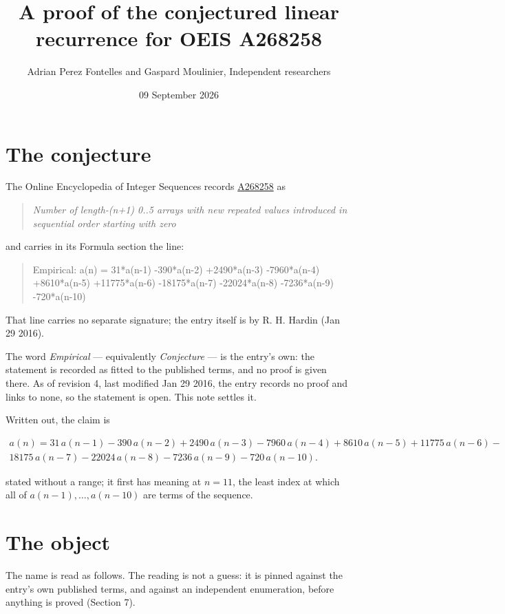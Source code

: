 \documentclass[11pt]{article}
\title{A proof of the conjectured linear recurrence for OEIS A268258}
\author{Adrian Perez Fontelles and Gaspard Moulinier, Independent researchers}
\date{09 September 2026}
\theoremstyle{definition}
\begin{document}
\maketitle
\section{The conjecture}

The Online Encyclopedia of Integer Sequences records \href{https://oeis.org/A268258}{A268258} as

\begin{quote}\itshape Number of length-(n+1) 0..5 arrays with new repeated values introduced in sequential order starting with zero\end{quote}

and carries in its Formula section the line:

\begin{quote}\ttfamily Empirical: a(n) = 31*a(n-1) -390*a(n-2) +2490*a(n-3) -7960*a(n-4) +8610*a(n-5) +11775*a(n-6) -18175*a(n-7) -22024*a(n-8) -7236*a(n-9) -720*a(n-10)\end{quote}

That line carries no separate signature; the entry itself is by R. H. Hardin (Jan 29 2016).

The word {\itshape Empirical} --- equivalently {\itshape Conjecture} --- is the entry's own: the statement is recorded as fitted to the published terms, and no proof is given there. As of revision 4, last modified Jan 29 2016, the entry records no proof and links to none, so the statement is open. This note settles it.

Written out, the claim is

\begin{multline*} a(n) = 31\,a(n-1) - 390\,a(n-2) + 2490\,a(n-3) - 7960\,a(n-4) + 8610\,a(n-5) + 11775\,a(n-6) - \\ 18175\,a(n-7) - 22024\,a(n-8) - 7236\,a(n-9) - 720\,a(n-10). \end{multline*}

stated without a range; it first has meaning at $n = 11$, the least index at which all of $a(n-1),\dots,a(n-10)$ are terms of the sequence.

\section{The object}

The name is read as follows. The reading is not a guess: it is pinned against the entry's own published terms, and against an independent enumeration, before anything is proved (Section 7).
\end{document}
